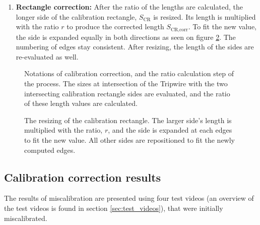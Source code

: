 \begin{enumerate}[align=parleft]
	with $fl(k_{\text{CR}}), fl(K_{\text{CR}})$ being the length values of the fitted line in the intersection points ($k_{\text{CR}}$ and $K_{\text{CR}}$) of the Tripwire.
	These length values correspond to the mean values of the length data stored in the proper rows of the Size Timeline.
	 
	After, the ratio of these two lengths is calculated, quantifying the degree of miscalibration, $r$:
	\begin{displaymath}
		r = \frac{L}{l}.
	\end{displaymath}
	
	The notations used above are illustrated in figure \ref{fig:ratio_calculation}.
	
	\item  \textbf{Rectangle correction:}
	After the ratio of the lengths are calculated, the longer side of the calibration rectangle, $S_{\text{CR}}$ is resized.
	Its length is multiplied with the ratio $r$ to produce the corrected length $S_{\text{CR,corr}}$.
	 To fit the new value, the side is expanded equally in both directions as seen on figure \ref{fig:resizing_cr}. 
	The numbering of edges stay consistent.
	After resizing, the length of the sides are re-evaluated as well.
\end{enumerate}

\begin{figure}[!h]
	\centering
	
	\caption[Notations of calibration correction]{Notations of calibration correction, and the ratio calculation step of the process. The sizes at intersection of the Tripwire with the two intersecting calibration rectangle sides are evaluated, and the ratio of these length values are calculated. \label{fig:ratio_calculation}}
\end{figure}

\begin{figure}[!h]
	\centering
	
	\caption[The resizing procedure of the calibration rectangle]{The resizing of the calibration rectangle. The larger side's length is multiplied with the ratio, $r$, and the side is expanded at each edges to fit the new value. All other sides are repositioned to fit the newly computed edges. \label{fig:resizing_cr}}
\end{figure}

\subsection{Calibration correction results}
The results of miscalibration are presented using four test videos (an overview of the test videos is found in section \ref{sec:test_videos}), that were initially miscalibrated.

